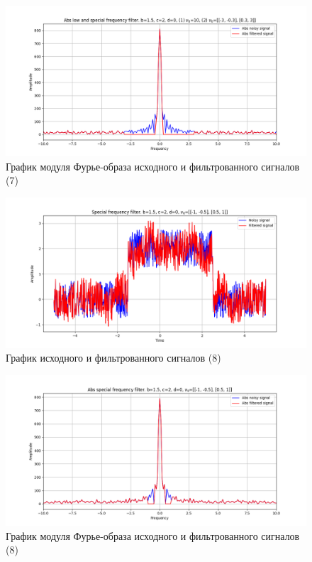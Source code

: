 \documentclass[a4paper, 12pt]{article}
\begin{document}
    \begin{figure}[H]
        \centering
        \includegraphics[scale=0.48]{7_3_abs_u_U_nospec.png}
        \captionsetup{skip=0pt}
        \caption{График модуля Фурье-образа исходного и фильтрованного сигналов (7)}
        \label{fig:f939}
    \end{figure}
    \begin{figure}[H]
        \centering
        \includegraphics[scale=0.48]{8_u_flt_u_nospec.png}
        \captionsetup{skip=0pt}
        \caption{График исходного и фильтрованного сигналов (8)}
        \label{fig:vbvbv}
    \end{figure}
    \begin{figure}[!htb]
        \centering
        \includegraphics[scale=0.48]{8_abs_u_U_nospec.png}
        \captionsetup{skip=0pt}
        \caption{График модуля Фурье-образа исходного и фильтрованного сигналов (8)}
        \label{fig:wewew}
    \end{figure}
\end{document}

